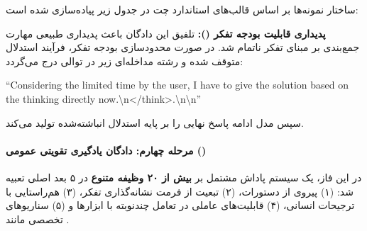 ساختار نمونه‌ها بر اساس قالب‌های استاندارد چت در جدول زیر پیاده‌سازی شده است:

\begin{table}[htbp]
\centering
\caption{قالب نمونه‌های دادگان  جهت تلفیق حالات تفکر و بدون تفکر در مدل‌های }
\label{tab:qwen3_chat_template}
\end{table}

\textbf{پدیداری قابلیت بودجه تفکر ():} تلفیق این دادگان باعث پدیداری طبیعی مهارت جمع‌بندی بر مبنای تفکر ناتمام شد. در صورت محدودسازی بودجه تفکر، فرآیند استدلال متوقف شده و رشته مداخله‌ای زیر در توالی درج می‌گردد:

\begin{center}
\parbox{0.92\linewidth}{\centering\ttfamily\small\latinfont
``Considering the limited time by the user, I have to give the solution based on the thinking directly now.\textbackslash n</think>.\textbackslash n\textbackslash n''
}
\end{center}
سپس مدل ادامه پاسخ نهایی را بر پایه استدلال انباشته‌شده تولید می‌کند.

\paragraph*{مرحله چهارم: دادگان یادگیری تقویتی عمومی ()}
در این فاز، یک سیستم پاداش مشتمل بر \textbf{بیش از ۲۰ وظیفه متنوع} در ۵ بعد اصلی تعبیه شد: (۱) پیروی از دستورات، (۲) تبعیت از فرمت نشانه‌گذاری تفکر، (۳) هم‌راستایی با ترجیحات انسانی، (۴) قابلیت‌های عاملی در تعامل چندنوبته با ابزارها و (۵) سناریوهای تخصصی مانند .

